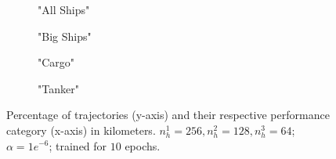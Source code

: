 \begin{figure}[H]
     \centering
     \begin{subfigure}[b]{0.496\textwidth}
         \centering
         
         \caption{"All Ships"}
     \end{subfigure}
     \hfill
     \begin{subfigure}[b]{0.496\textwidth}
         \centering
         
         \caption{"Big Ships"}
         \label{fig:plotBig}
     \end{subfigure}
     \hfill
     \begin{subfigure}[b]{0.496\textwidth}
         \centering
         
         \caption{"Cargo"}
     \end{subfigure}
          \hfill
     \begin{subfigure}[b]{0.496\textwidth}
         \centering
         
         \caption{"Tanker"}
     \end{subfigure}
        \caption{Percentage of trajectories (y-axis) and their respective performance category (x-axis) in kilometers. $n_h^1=256, n_h^2=128, n_h^3=64$; $\alpha=1e^{-6}$; trained for $10$ epochs.}
             \label{fig:resultssBar}

\end{figure}

